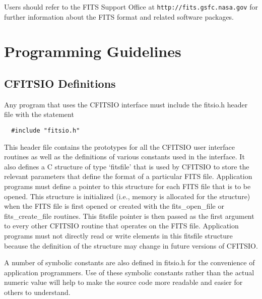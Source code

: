 \documentclass[11pt]{book}
\begin{document}
Users should refer to the FITS Support Office at {\tt http://fits.gsfc.nasa.gov}
for further information about the FITS format and related software
packages.


\chapter{ Programming Guidelines }


\section{CFITSIO Definitions}

Any program that uses the CFITSIO interface must include the fitsio.h
header file with the statement

\begin{verbatim}
  #include "fitsio.h"
\end{verbatim}
This header file contains the prototypes for all the CFITSIO user
interface routines as well as the definitions of various constants used
in the interface.  It also defines a C structure of type `fitsfile'
that is used by CFITSIO to store the relevant parameters that define
the format of a particular FITS file.  Application programs must define
a pointer to this structure for each FITS file that is to be opened.
This structure is initialized (i.e., memory is allocated for the
structure) when the FITS file is first opened or created with the
fits\_open\_file or fits\_create\_file routines.  This fitsfile pointer
is then passed as the first argument to every other CFITSIO routine
that operates on the FITS file.  Application programs must not directly
read or write elements in this fitsfile structure because the
definition of the structure may change in future versions of CFITSIO.

A number of symbolic constants are also defined in fitsio.h for the
convenience of application programmers.  Use of these symbolic
constants rather than the actual numeric value will help to make the
source code more readable and easier for others to understand.
\end{document}
